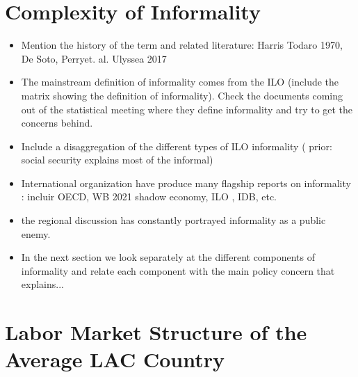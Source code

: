 \documentclass[english]{article}
\begin{document}
\section{Complexity of Informality}
\begin{itemize}
    \item Mention the history of the term and related literature: Harris Todaro 1970, De Soto, Perryet. al. Ulyssea 2017
 
    \item The mainstream definition of informality comes from the ILO (include the matrix showing the definition of informality). Check the documents coming out of the statistical meeting where they define informality and try to get the concerns behind. 
    \item Include a disaggregation of the different types of ILO informality ( prior: social security explains most of the informal)
       \item International organization have produce many flagship reports on informality : incluir OECD, WB 2021 shadow economy, ILO , IDB, etc. 
       \item the regional discussion has constantly portrayed informality as a public enemy.  
    \item In the next section we look separately at the different components of informality and relate each component with the main policy concern that explains...
\end{itemize}

\section{Labor Market Structure of the Average LAC Country}
\end{document}
